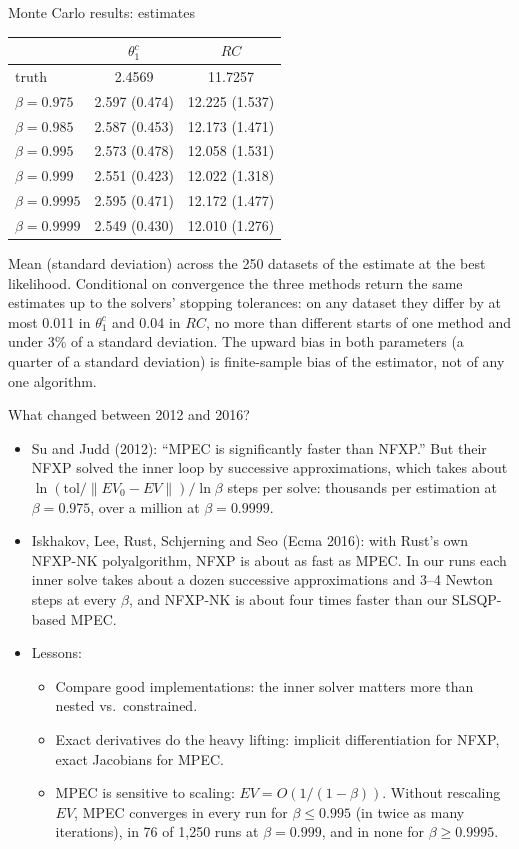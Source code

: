\documentclass[aspectratio=169,11pt]{beamer}
\begin{document}
\begin{frame}{Monte Carlo results: estimates}
\footnotesize
\begin{center}
\begin{tabular}{l cc}
\toprule
 & $\theta^c_1$ & $RC$\\
\midrule
truth & 2.4569 & 11.7257\\
\midrule
$\beta = 0.975$  & 2.597 (0.474) & 12.225 (1.537)\\
$\beta = 0.985$  & 2.587 (0.453) & 12.173 (1.471)\\
$\beta = 0.995$  & 2.573 (0.478) & 12.058 (1.531)\\
$\beta = 0.999$  & 2.551 (0.423) & 12.022 (1.318)\\
$\beta = 0.9995$ & 2.595 (0.471) & 12.172 (1.477)\\
$\beta = 0.9999$ & 2.549 (0.430) & 12.010 (1.276)\\
\bottomrule
\end{tabular}
\end{center}
Mean (standard deviation) across the 250 datasets of the estimate at the best likelihood. Conditional on convergence the three methods return the same estimates up to the solvers' stopping tolerances: on any dataset they differ by at most 0.011 in $\theta^c_1$ and 0.04 in $RC$, no more than different starts of one method and under 3\% of a standard deviation. The upward bias in both parameters (a quarter of a standard deviation) is finite-sample bias of the estimator, not of any one algorithm.
\end{frame}

\begin{frame}{What changed between 2012 and 2016?}
\begin{itemize}
\item Su and Judd (2012): ``MPEC is significantly faster than NFXP.'' But their NFXP solved the inner loop by successive approximations, which takes about $\ln(\text{tol}/\|EV_0 - EV\|)/\ln\beta$ steps per solve: thousands per estimation at $\beta = 0.975$, over a million at $\beta = 0.9999$.
\item Iskhakov, Lee, Rust, Schjerning and Seo (Ecma 2016): with Rust's own NFXP-NK polyalgorithm, NFXP is about as fast as MPEC. In our runs each inner solve takes about a dozen successive approximations and 3--4 Newton steps at every $\beta$, and NFXP-NK is about four times faster than our SLSQP-based MPEC.
\item Lessons:
\begin{itemize}
\item Compare good implementations: the inner solver matters more than nested vs.\ constrained.
\item Exact derivatives do the heavy lifting: implicit differentiation for NFXP, exact Jacobians for MPEC.
\item MPEC is sensitive to scaling: $EV = O(1/(1-\beta))$. Without rescaling $EV$, MPEC converges in every run for $\beta \le 0.995$ (in twice as many iterations), in 76 of 1{,}250 runs at $\beta = 0.999$, and in none for $\beta \ge 0.9995$.
\end{itemize}
\end{itemize}
\end{frame}
\end{document}
